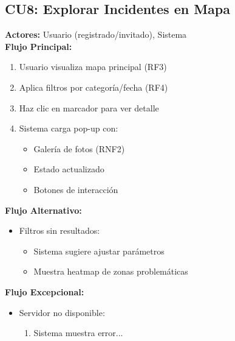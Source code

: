 \begin{multicols}{2}
\subsection*{CU8: Explorar Incidentes en Mapa}
\textbf{Actores:} Usuario (registrado/invitado), Sistema\\
\textbf{Flujo Principal:}
\begin{enumerate}
    \item Usuario visualiza mapa principal (RF3)
    \item Aplica filtros por categoría/fecha (RF4)
    \item Haz clic en marcador para ver detalle
    \item Sistema carga pop-up con:
    \begin{itemize}
        \item Galería de fotos (RNF2)
        \item Estado actualizado
        \item Botones de interacción
    \end{itemize}
\end{enumerate}

\textbf{Flujo Alternativo:}
\begin{itemize}
    \item Filtros sin resultados:
    \begin{itemize}
        \item Sistema sugiere ajustar parámetros
        \item Muestra heatmap de zonas problemáticas
    \end{itemize}
\end{itemize}

\textbf{Flujo Excepcional:}
\begin{itemize}
    \item Servidor no disponible:
    \begin{enumerate}
        \item Sistema muestra error...
    \end{enumerate}
\end{itemize}


\end{multicols}

